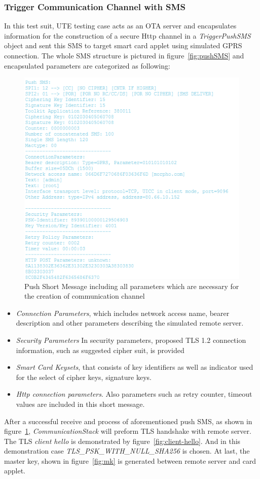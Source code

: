 \subsubsection{Trigger Communication Channel with SMS} \label{secAppletTest1}
In this test suit, UTE testing case acts as an OTA server and encapsulates information for the construction of a secure Http channel in a \emph{TriggerPushSMS} object and sent this SMS to target smart card applet using simulated GPRS connection.  The whole SMS structure is pictured in figure~\ref{fig:pushSMS} and encapsulated parameters are categorized as following:
\begin{figure}[!htb]
	\centering
	\includegraphics[width=1.0\textwidth]{Images/impl/push-sms.png}
		\caption{Push Short Message including all parameters which are necessary for the creation of communication channel}
	\label{fig:push-sms}
\end{figure}
\begin{itemize}
\item \emph{Connection Parameters}, which includes network access name, bearer description and other parameters describing the simulated remote server.
\item \emph{Security Parameters} In security parameters, proposed TLS 1.2 connection information, such as suggested cipher suit, is provided
\item \emph{Smart Card Keysets}, that consists of key identifiers as well as indicator used for the select of cipher keys, signature keys.
\item \emph{Http connection parameters}. Also parameters such as retry counter, timeout values are included in this short message.
\end{itemize}
After a successful receive and process of aforementioned push SMS, as shown in figure~\ref{fig:push-sms}, \emph{CommunicationStack} will preform TLS handshake with remote server. The TLS \emph{client hello} is demonstrated by figure~\ref{fig:client-hello}. And in this demonstration case \emph{TLS\_PSK\_WITH\_NULL\_SHA256} is chosen. At last, the master key, shown in figure~\ref{fig:mk} is generated between remote server and card applet.

